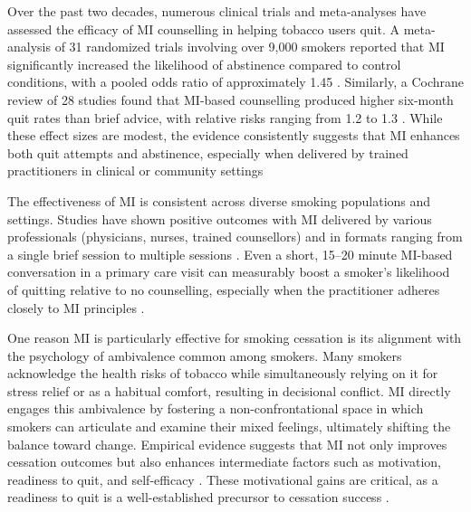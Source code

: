 Over the past two decades, numerous clinical trials and meta-analyses have assessed the efficacy of MI counselling in helping tobacco users quit. A meta-analysis of 31 randomized trials involving over 9,000 smokers reported that MI significantly increased the likelihood of abstinence compared to control conditions, with a pooled odds ratio of approximately 1.45 \cite{Heckman2010}. Similarly, a Cochrane review of 28 studies found that MI-based counselling produced higher six-month quit rates than brief advice, with relative risks ranging from 1.2 to 1.3 \cite{Lindson2015}. While these effect sizes are modest, the evidence consistently suggests that MI enhances both quit attempts and abstinence, especially when delivered by trained practitioners in clinical or community settings

The effectiveness of MI is consistent across diverse smoking populations and settings. Studies have shown positive outcomes with MI delivered by various professionals (physicians, nurses, trained counsellors) and in formats ranging from a single brief session to multiple sessions \cite{Lindson2015}. Even a short, 15–20 minute MI-based conversation in a primary care visit can measurably boost a smoker's likelihood of quitting relative to no counselling, especially when the practitioner adheres closely to MI principles \cite{zanjani2008effectiveness}. 


One reason MI is particularly effective for smoking cessation is its alignment with the psychology of ambivalence common among smokers. Many smokers acknowledge the health risks of tobacco while simultaneously relying on it for stress relief or as a habitual comfort, resulting in decisional conflict. MI directly engages this ambivalence by fostering a non-confrontational space in which smokers can articulate and examine their mixed feelings, ultimately shifting the balance toward change. Empirical evidence suggests that MI not only improves cessation outcomes but also enhances intermediate factors such as motivation, readiness to quit, and self-efficacy \cite{Boudreaux2012, Hettema2005}. These motivational gains are critical, as a readiness to quit is a well-established precursor to cessation success \cite{West2006}.




